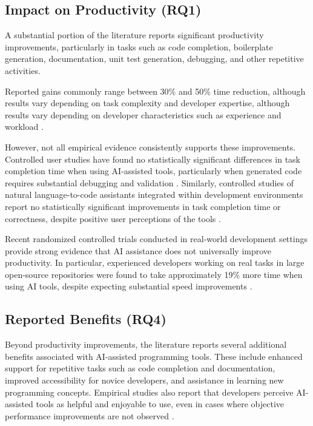 \documentclass[conference]{IEEEtran}
\begin{document}
\subsection{Impact on Productivity (RQ1)}

A substantial portion of the literature reports significant productivity improvements, particularly in tasks such as code completion, boilerplate generation, documentation, unit test generation, debugging, and other repetitive activities.

Reported gains commonly range between 30\% and 50\% time reduction, although results vary depending on task complexity and developer expertise, although results vary depending on developer characteristics such as experience and workload \cite{peng2023productivity}.

However, not all empirical evidence consistently supports these improvements. Controlled user studies have found no statistically significant differences in task completion time when using AI-assisted tools, particularly when generated code requires substantial debugging and validation \cite{vaithilingam2022usability}. Similarly, controlled studies of natural language-to-code assistants integrated within development environments report no statistically significant improvements in task completion time or correctness, despite positive user perceptions of the tools \cite{xu2022nl2code}.

Recent randomized controlled trials conducted in real-world development settings provide strong evidence that AI assistance does not universally improve productivity. In particular, experienced developers working on real tasks in large open-source repositories were found to take approximately 19\% more time when using AI tools, despite expecting substantial speed improvements \cite{becker2025impact}.

\subsection{Reported Benefits (RQ4)}

Beyond productivity improvements, the literature reports several additional benefits associated with AI-assisted programming tools. These include enhanced support for repetitive tasks such as code completion and documentation, improved accessibility for novice developers, and assistance in learning new programming concepts. Empirical studies also report that developers perceive AI-assisted tools as helpful and enjoyable to use, even in cases where objective performance improvements are not observed \cite{xu2022nl2code}.
\end{document}
